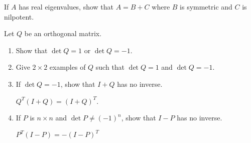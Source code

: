 \documentclass{ximera}
\begin{document}
\begin{problem}\label{prob:ortho18}
If $A$ has real eigenvalues, show that $A = B + C$ where $B$ is symmetric and $C$ is nilpotent. 
\end{problem}

\begin{problem}\label{prob:ortho19}
Let $Q$ be an orthogonal matrix.

\begin{enumerate}
\item Show that $\det Q = 1$ or $\det Q = -1$.

\item Give $2 \times 2$ examples of $Q$ such that $\det Q = 1$ and $\det  Q = -1$.

\item If $\det  Q = -1$, show that $I + Q$ has no inverse.
\begin{hint}
$Q^{T}(I + Q) = (I + Q)^{T}$.
\end{hint}

\item If $P$ is $n \times n$ and $\det P \neq (-1)^{n}$, show that $I - P$ has no inverse.

\begin{hint}
$P^{T}(I - P) = -(I - P)^{T}$
\end{hint}
\end{enumerate}


\end{problem}
\end{document}
